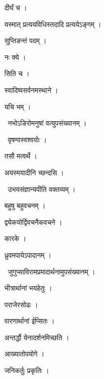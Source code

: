 \documentclass[10pt, openany, oneside]{book}
\begin{document}
\noindent दीर्घं च ।

\noindent यस्मात् प्रत्ययविधिस्तदादि प्रत्ययेऽङ्गम् ।

\noindent सुप्तिङन्तं पदम् ।

\noindent नः क्ये ।

\noindent सिति च ।

\noindent स्वादिष्वसर्वनमस्थाने ।

\noindent यचि भम् ।

\par\noindent\hspace{1.5em}{\vps वा॰}~{\qt नभोऽङिरोमनुषां वत्युपसंख्यानम् ।}

\par\noindent\hspace{1.5em}{\vps वा॰}~{\qt वृषण्वस्वश्वयोः ।}

\noindent तसौ मत्वर्थे ।

\noindent अयस्मयादीनि च्छन्दसि ।

\par\noindent\hspace{1.5em}{\vps वा॰}~{\qt उभयसंज्ञान्यपीति वक्तव्यम् ।}

\noindent बहुषु बहुवचनम् ।

\noindent द्व्येकयोर्द्विवचनैकवचने ।

\noindent कारके ।

\noindent ध्रुवमपायेऽपादानम् ।

\par\noindent\hspace{1.5em}{\vps वा॰}~{\qt जुगुप्साविरामप्रमादार्थनामुपसंख्यानम् ।}

\noindent भीत्रार्थानां भयहेतुः ।

\noindent पराजेरसोढः ।

\noindent वारणार्थानां ईप्सितः ।

\noindent अन्तर्द्धौ येनादर्शनमिच्छति ।

\noindent आख्यातोपयोगे ।

\noindent जनिकर्तुः प्रकृतिः ।
\end{document}
